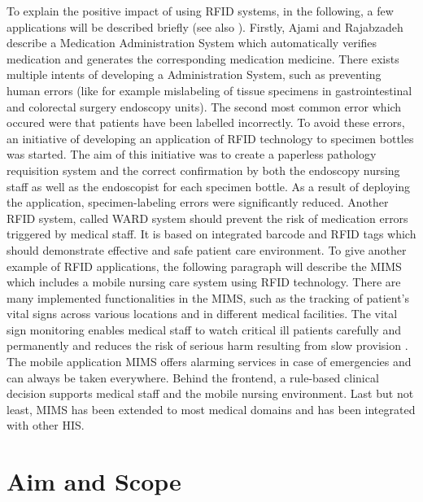 To explain the positive impact of using RFID systems, in the following, a few applications will be described briefly (see also \cite{ncbi}). Firstly, Ajami and Rajabzadeh describe a Medication Administration System which automatically verifies medication and generates the corresponding medication medicine. There exists multiple intents of developing a Administration System, such as preventing human errors (like for example mislabeling of tissue specimens in gastrointestinal and colorectal surgery endoscopy units). The second most common error which occured were that patients have been labelled incorrectly. To avoid these errors, an initiative of developing an application of RFID technology to specimen bottles was started. The aim of this initiative was to create a paperless pathology requisition system and the correct confirmation by both the endoscopy nursing staff as well as the endoscopist for each specimen bottle. As a result of deploying the application, specimen-labeling errors were significantly reduced.
Another RFID system, called \ac{WARD} system should prevent the risk of medication errors triggered by medical staff. It is based on integrated barcode and RFID tags which should demonstrate effective and safe patient care environment. 
To give another example of RFID applications, the following paragraph will describe the \ac{MIMS} which includes a mobile nursing care system using RFID technology. There are many implemented functionalities in the MIMS, such as the tracking of patient's vital signs across various locations and in different medical facilities. The vital sign monitoring enables medical staff to watch critical ill patients carefully and permanently and reduces the risk of serious harm resulting from slow provision \cite{ncbi}. The mobile application MIMS offers alarming services in case of emergencies and can always be taken everywhere. Behind the frontend, a rule-based clinical decision supports medical staff and the mobile nursing environment. Last but not least, MIMS has been extended to most medical domains and has been integrated with other HIS.

\section{Aim and Scope}

